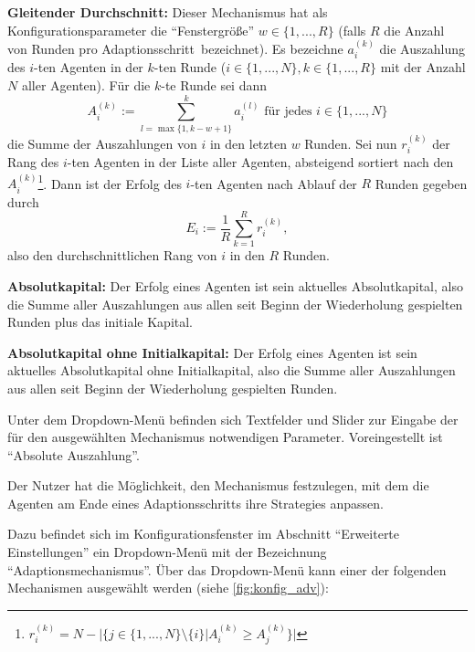 \documentclass[parskip=full,11pt]{scrartcl}
\def\adapt{Adaptionsschritt}
\begin{document}
\textbf{Gleitender Durchschnitt:}
Dieser Mechanismus hat als Konfigurationsparameter die \enquote{Fenstergröße} \(w \in \{1,...,R\}\) (falls \(R\) die Anzahl von Runden pro \adapt\ bezeichnet). Es bezeichne \(a_i^{(k)}\) die Auszahlung des \(i\)-ten Agenten in der \(k\)-ten Runde (\(i \in \{1,...,N\}, k \in \{1,...,R\}\) mit der Anzahl \(N\) aller Agenten). Für die \(k\)-te Runde sei dann
\[
A_i^{(k)} := \sum_{l = \max\{1,k-w+1\}}^k a_i^{(l)} \text{  für jedes  } i \in \{1,...,N\}
\]
die Summe der Auszahlungen von \(i\) in den letzten \(w\) Runden. Sei nun \(r_i^{(k)}\) der Rang des \(i\)-ten Agenten in der Liste aller Agenten, absteigend sortiert nach den \(A_i^{(k)}\)\footnote{\(r_i^{(k)} = N - |\{j \in \{1,...,N\} \setminus \{i\} | A_i^{(k)} \geq A_j^{(k)}\}|\)}. Dann ist der \Gls{Erfolg} des \(i\)-ten Agenten nach Ablauf der \(R\) Runden gegeben durch
\[
E_i := \frac 1R \sum_{k=1}^R r_i^{(k)},
\]
also den durchschnittlichen Rang von \(i\) in den \(R\) Runden.

\textbf{Absolutkapital:}
Der \Gls{Erfolg} eines Agenten ist sein aktuelles Absolutkapital, also die Summe aller Auszahlungen aus allen seit Beginn der Wiederholung gespielten Runden plus das initiale \Gls{Kapital}.

\textbf{Absolutkapital ohne Initialkapital:}
Der \Gls{Erfolg} eines Agenten ist sein aktuelles Absolutkapital ohne Initialkapital, also die Summe aller Auszahlungen aus allen seit Beginn der Wiederholung gespielten Runden.

Unter dem Dropdown-Menü befinden sich Textfelder und Slider zur Eingabe der für den ausgewählten Mechanismus notwendigen Parameter. Voreingestellt ist \enquote{Absolute Auszahlung}.

Der \Gls{Nutzer} hat die Möglichkeit, den Mechanismus festzulegen, mit dem die Agenten am Ende eines \adapt s ihre \Glspl{Strategie} anpassen.

Dazu befindet sich im Konfigurationsfenster im Abschnitt \enquote{Erweiterte Einstellungen} ein Dropdown-Menü mit der Bezeichnung \enquote{Adaptionsmechanismus}. Über das Dropdown-Menü kann einer der folgenden Mechanismen ausgewählt werden (siehe \cref{fig:konfig_adv}):
\end{document}
